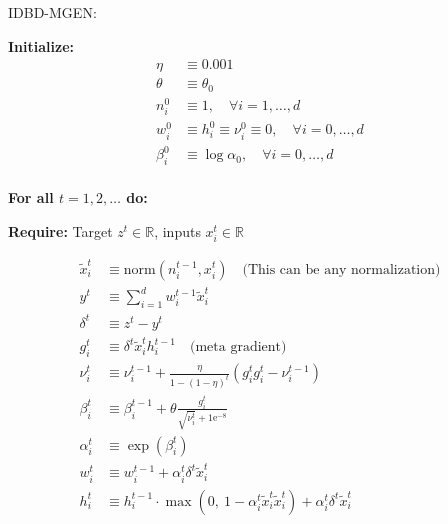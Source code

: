 \documentclass{article}
\begin{document}
	{\large IDBD-MGEN:}
	
	\medskip
	
	\textbf{Initialize:}
	\begin{align*}
		\eta & \equiv 0.001\\
		\theta & \equiv  \theta_0\\
		n_i^0 & \equiv 1, \quad \forall i = 1, \dots, d \\
		w_i^0 & \equiv h_i^0 \equiv \nu_i^0 \equiv 0, \quad \forall i = 0, \dots, d \\
		 \beta_i^0 & \equiv  \log \alpha_0, \quad \forall i = 0, \dots, d \\
	\end{align*}
	
	\textbf{For all $t = 1, 2, \dots$ do:}
	
	\textbf{Require:} Target $z^t \in \mathbb{R}$, inputs $x_i^t \in \mathbb{R}$
	
	
	\begin{align}
		\tilde{x}_i^t &\equiv \text{norm}(n_i^{t-1}, x_i^t) \quad \text{(This can be any normalization)} \\
		y^t &\equiv \sum_{i=1}^d w_i^{t-1} \tilde{x}_i^t \\
		\delta^t &\equiv z^t - y^t \\
		g_i^t &\equiv \delta^t \tilde{x}_i^t h_i^{t-1} \quad \text{(meta gradient)} \\
		\nu_i^t &\equiv \nu_i^{t-1} + \frac{\eta}{1 - (1 - \eta)^t} \left( g_i^t g_i^t - \nu_i^{t-1} \right) \\
		\beta_i^t &\equiv \beta_i^{t-1} + \theta \frac{g_i^t}{\sqrt{\nu_i^t} + 1\text{e}^{-8}} \\
		\alpha_i^t &\equiv \exp(\beta_i^t) \\
		w_i^t &\equiv w_i^{t-1} + \alpha_i^t \delta^t \tilde{x}_i^t \\
		h_i^t &\equiv h_i^{t-1} \cdot \max\left( 0,\ 1 - \alpha_i^t \tilde{x}_i^t\tilde{x}_i^t\right) + \alpha_i^t \delta^t \tilde{x}_i^t
	\end{align}
	
	
\end{document}

